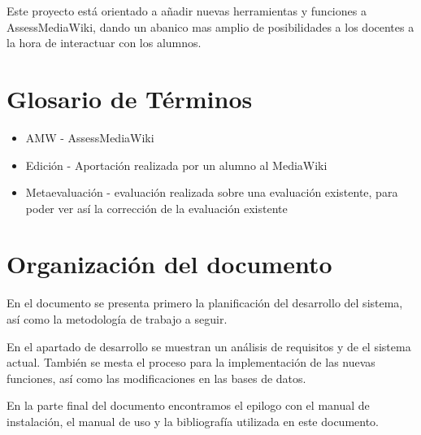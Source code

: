 Este proyecto está orientado a añadir nuevas herramientas y funciones a AssessMediaWiki, dando un abanico mas amplio de posibilidades a los docentes a la hora de interactuar con los alumnos.

\section{Glosario de Términos} 

\begin{itemize}
	\item AMW - AssessMediaWiki
	\item Edición - Aportación realizada por un alumno al MediaWiki
	\item Metaevaluación - evaluación realizada sobre una evaluación existente, para poder ver así la corrección de la evaluación existente
\end{itemize}

\section{Organización del documento}

En el documento se presenta primero la planificación del desarrollo del sistema, así como la metodología de trabajo a seguir.
\newline

En el apartado de desarrollo se muestran un análisis de requisitos y de el sistema actual. También se mesta el proceso para la implementación de las nuevas funciones, así como las modificaciones en las bases de datos.
\newline

En la parte final del documento encontramos el epilogo con el manual de instalación, el manual de uso y la bibliografía utilizada en este documento.



